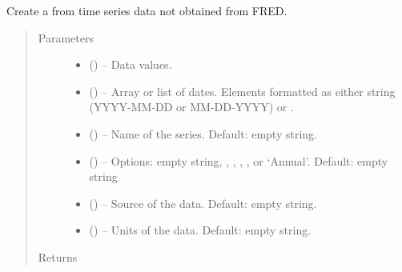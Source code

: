 \documentclass[letterpaper,10pt,openany,oneside,english]{sphinxmanual}
\begin{document}
\begin{fulllineitems}
\label{\detokenize{additional_functions:fredpy.toFredSeries}}
Create a {\hyperref[\detokenize{series_class:fredpy.series}]{}} from time series data not obtained from FRED.
\begin{quote}\begin{description}
\item[{Parameters}] \leavevmode\begin{itemize}
\item {} 
 (\sphinxstyleliteralemphasis{, }\href{https://docs.python.org/2/library/functions.html\#list}{}) -- Data values.

\item {} 
 (\href{https://docs.python.org/2/library/functions.html\#list}{}) -- Array or list of dates. Elements formatted as either string (YYYY-MM-DD or MM-DD-YYYY) or .

\item {} 
 (\href{https://docs.python.org/2/library/functions.html\#str}{}) -- Name of the series. Default: empty string.

\item {} 
 (\href{https://docs.python.org/2/library/functions.html\#str}{}) -- Options: empty string, , , , , or `Annual'. Default: empty string

\item {} 
 (\href{https://docs.python.org/2/library/functions.html\#str}{}) -- Source of the data. Default: empty string.

\item {} 
 (\href{https://docs.python.org/2/library/functions.html\#str}{}) -- Units of the data. Default: empty string.

\end{itemize}

\item[{Returns}] \leavevmode
{\hyperref[\detokenize{series_class:fredpy.series}]{}}

\end{description}\end{quote}

\end{fulllineitems}
\end{document}
